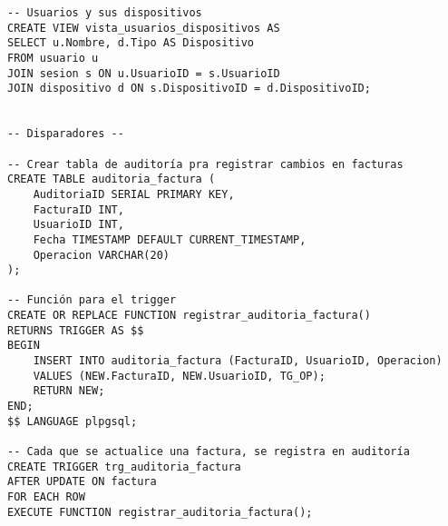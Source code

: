 \documentclass[12pt,a4paper]{article}
\begin{document}
\begin{lstlisting}
-- Usuarios y sus dispositivos
CREATE VIEW vista_usuarios_dispositivos AS
SELECT u.Nombre, d.Tipo AS Dispositivo
FROM usuario u
JOIN sesion s ON u.UsuarioID = s.UsuarioID
JOIN dispositivo d ON s.DispositivoID = d.DispositivoID;


-- Disparadores --

-- Crear tabla de auditoría pra registrar cambios en facturas
CREATE TABLE auditoria_factura (
    AuditoriaID SERIAL PRIMARY KEY,
    FacturaID INT,
    UsuarioID INT,
    Fecha TIMESTAMP DEFAULT CURRENT_TIMESTAMP,
    Operacion VARCHAR(20)
);

-- Función para el trigger
CREATE OR REPLACE FUNCTION registrar_auditoria_factura()
RETURNS TRIGGER AS $$
BEGIN
    INSERT INTO auditoria_factura (FacturaID, UsuarioID, Operacion)
    VALUES (NEW.FacturaID, NEW.UsuarioID, TG_OP);
    RETURN NEW;
END;
$$ LANGUAGE plpgsql;

-- Cada que se actualice una factura, se registra en auditoría
CREATE TRIGGER trg_auditoria_factura
AFTER UPDATE ON factura
FOR EACH ROW
EXECUTE FUNCTION registrar_auditoria_factura();
\end{lstlisting}
\end{document}
